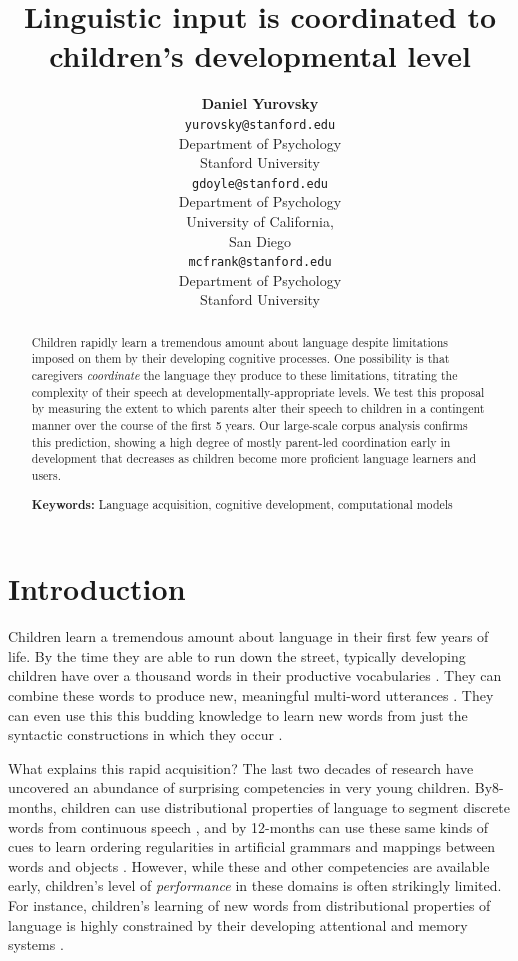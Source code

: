 \documentclass[10pt,letterpaper]{article}
\title{Linguistic input is coordinated to children's developmental level}
\author{{\large \bf Daniel Yurovsky} \\ \texttt{yurovsky@stanford.edu}\\ Department of Psychology \\ Stanford University
 	\And {\large \bf Gabriel Doyle} \\ \texttt{gdoyle@stanford.edu} \\ Department of Psychology \\ University of California,\\ San Diego
	\And {\large \bf Michael C. Frank} \\ \texttt{mcfrank@stanford.edu} \\ Department of Psychology \\ Stanford University}
\begin{document}
\maketitle

\begin{abstract}

Children rapidly learn a tremendous amount about language despite limitations imposed on them by their developing cognitive processes. One possibility is that caregivers \emph{coordinate} the language they produce to these limitations, titrating the complexity of their speech at developmentally-appropriate levels. We test this proposal by measuring the extent to which parents alter their speech to children in a contingent manner over the course of the first 5 years. Our large-scale corpus analysis confirms this prediction, showing a high degree of mostly parent-led coordination early in development that decreases as children become more proficient language learners and users. 

\textbf{Keywords:} 
Language acquisition, cognitive development, computational models
\end{abstract}

\section{Introduction}

Children learn a tremendous amount about language in their first few years of life. By the time they are able to run down the street, typically developing children have over a thousand words in their productive vocabularies \cite{mayor2011}. They can combine these words to produce new, meaningful multi-word utterances \cite{lieven2009}. They can even use this this budding knowledge to learn new words from just the syntactic constructions in which they occur \cite{yuan2009}.

What explains this rapid acquisition? The last two decades of research have uncovered an abundance of surprising competencies in very young children. By8-months, children can use distributional properties of language to segment discrete words from continuous speech \cite{saffran1996}, and by 12-months can use these same kinds of cues to learn ordering regularities in artificial grammars \cite{gomez1999} and mappings between words and objects \cite{smith2008}. However, while these and other competencies are available early, children's level of \emph{performance} in these domains is often strikingly limited. For instance, children's learning of new words from distributional properties of language is highly constrained by their developing attentional and memory systems \cite{vlach2012, vlach2013}. 
\end{document}
